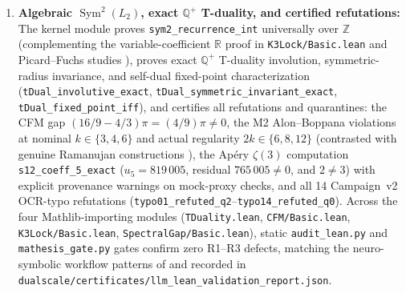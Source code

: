 \begin{enumerate}
    Eight universal \texttt{EtaQuot} theorems (\texttt{weight2\_append}, \texttt{weight2\_invert}, \texttt{onoSumDR\_append}, \texttt{onoSumDR\_invert}, \texttt{onoSumNOverDR\_append}, \texttt{onoSumNOverDR\_invert}, \texttt{onoMod24\_closed\_append}, \texttt{onoMod24\_closed\_invert}) verify closure of Ono's Theorem~1.64 conditions \cite{Ono2004} under multiplication and inversion, aligning with $\eta$-quotient generation and cuspidal structure theory \cite{RouseWebb2015, AcresBroadhurst2018, Bhattacharya2026}. Six live kernel theorems (\texttt{deepBurn\_ceff\_cusp0}, \texttt{deepBurn\_weight}, \texttt{deepBurn\_E0}, \texttt{deepBurn\_ono\_false}, \texttt{deepBurn\_prefix\_10}, \texttt{deepBurn\_has\_negative\_coeff}) upgrade the RAMA Deep Burn invariants ($c_{\text{eff}}(0) = -823/2310 < 0$, $k = -183/2$, $E_0 = 425/6$, non-modular, negative $q^1$ coefficient $-24$) to \tierA{}, situating mock-theta and BPS asymptotics within \cite{MalmendierOno2012, BallantineBursonFolsom2022, CostinDunneSaraeb2026, DMZ2012, CDH2014}.
  \item \textbf{Algebraic $\operatorname{Sym}^2(L_2)$, exact $\mathbb{Q}^+$ T-duality, and certified \tierX{} refutations:}
    The kernel module proves \texttt{sym2\_recurrence\_int} universally over $\mathbb{Z}$ (complementing the variable-coefficient $\mathbb{R}$ proof in \texttt{K3Lock/Basic.lean} and Picard--Fuchs studies \cite{AlmkvistZudilin2005, DoranHarderThompson2016}), proves exact $\mathbb{Q}^+$ T-duality involution, symmetric-radius invariance, and self-dual fixed-point characterization (\texttt{tDual\_involutive\_exact}, \texttt{tDual\_symmetric\_invariant\_exact}, \texttt{tDual\_fixed\_point\_iff}), and certifies all refutations and quarantines: the CFM gap $(16/9 - 4/3)\pi = (4/9)\pi \neq 0$, the M2 Alon--Boppana violations at nominal $k \in \{3,4,6\}$ and actual regularity $2k \in \{6,8,12\}$ (contrasted with genuine Ramanujan constructions \cite{MSS2015}), the Ap\'{e}ry $\zeta(3)$ computation \texttt{s12\_coeff\_5\_exact} ($u_5 = 819\,005$, residual $765\,005 \neq 0$, and $2 \neq 3$) with explicit \tierX{} provenance warnings on mock-proxy checks, and all 14 Campaign~v2 OCR-typo refutations (\texttt{typo01\_refuted\_q2}--\texttt{typo14\_refuted\_q0}). Across the four Mathlib-importing modules (\texttt{TDuality.lean}, \texttt{CFM/Basic.lean}, \texttt{K3Lock/Basic.lean}, \texttt{SpectralGap/Basic.lean}), static \texttt{audit\_lean.py} and \texttt{mathesis\_gate.py} gates confirm zero R1--R3 defects, matching the neuro-symbolic workflow patterns of \cite{Yang2023LeanDojo, Song2024LeanCopilot, Xin2024DeepSeekProver, Kripner2026OpenProver} and recorded in \texttt{dualscale/certificates/llm\_lean\_validation\_report.json}.
\end{enumerate}
